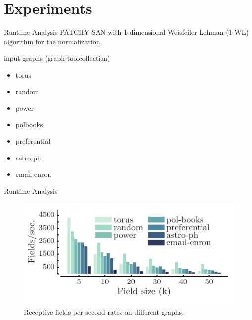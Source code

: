 \documentclass[dvipdfmx]{beamer}
\begin{document}
\section{Experiments}

  \begin{frame}{Runtime Analysis}
    PATCHY-SAN with 1-dimensional Weisfeiler-Lehman (1-WL) algorithm for the normalization.
    \vspace{5mm}

    \begin{block}{input graphs (graph-tool\footnotemark collection)}
      \begin{itemize}
        \item torus
        \item random
        \item power
        \item polbooks
        \item preferential
        \item astro-ph
        \item email-enron
      \end{itemize}
    \end{block}
  \end{frame}

  \begin{frame}{Runtime Analysis}
    \begin{figure}[h]
      \centering
      \includegraphics[width=0.8\paperwidth]{img/Fig4.pdf}
      \caption{Receptive fields per second rates on different graphs.}
    \end{figure} 

  \end{frame}
\end{document}

